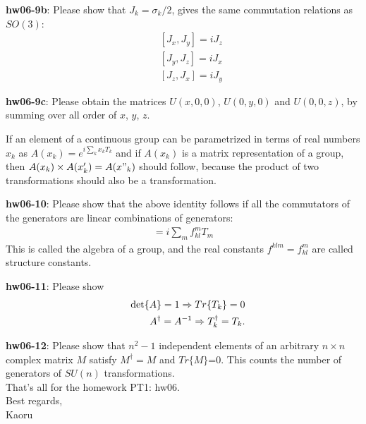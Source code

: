 \documentclass[12pt]{article}
\begin{document}
{\bf hw06-9b}:  Please show that $J_k = \sigma_k/2$, gives the same
  commutation relations as $SO(3)$:
  \begin{eqnarray}
    &&[ J_x, J_y ] = i J_z \\
    &&[ J_y, J_z ] = i J_x \\
    &&[ J_z, J_x ] = i J_y
  \end{eqnarray}

{\bf hw06-9c}:  Please obtain the matrices $U(x,0,0)$, $U(0,y,0)$
  and $U(0,0,z)$, by summing over all order of $x$, $y$, $z$.

  If an element of a continuous group can be parametrized
  in terms of real numbers $x_k$ as  $A(x_k) = e^{ i \sum_k x_k T_k }$
  and if $A(x_k)$ is a matrix representation of a group, then $A(x_k) \times A(x'_k) = A(x"_k)$
  should follow, because the product of two transformations
  should also be a transformation.

{\bf hw06-10}: Please show that the above identity follows if all the
  commutators of the generators are linear combinations of generators:
\begin{eqnarray}
  [ T_k, T_l ] = i \sum_m f^m_{kl} T_m
\end{eqnarray}
  This is called the algebra of a group, and the real constants
  $f^{klm} = f^m_{kl}$ are called structure constants.

{\bf hw06-11}: Please show
\begin{eqnarray}
  &&{\rm det}\{A\} = 1  \Rightarrow   Tr\{T_k\} = 0\\
  &&A^\dagger = A^{-1} \Rightarrow T_k^\dagger = T_k.
\end{eqnarray}

{\bf hw06-12}: Please show that $n^2-1$ independent elements of an arbitrary
  $n\times n$ complex matrix $M$ satisfy $M^\dagger=M$ and $Tr\{M\}$=0.  This counts
  the number of generators of $SU(n)$ transformations.\\

That's all for the homework PT1: hw06.\\

Best regards,\\

Kaoru
\end{document}
